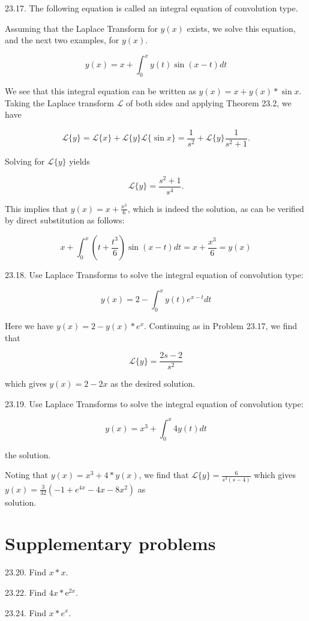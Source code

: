 \documentclass[10pt]{article}
\begin{document}
23.17. The following equation is called an integral equation of convolution type.

Assuming that the Laplace Transform for $y(x)$ exists, we solve this equation, and the next two examples, for $y(x)$.

$$
y(x)=x+\int_{0}^{x} y(t) \sin (x-t) d t
$$

We see that this integral equation can be written as $y(x)=x+y(x) * \sin x$. Taking the Laplace transform $\mathscr{L}$ of both sides and applying Theorem 23.2, we have

$$
\mathscr{L}\{y\}=\mathscr{L}\{x\}+\mathscr{L}\{y\} \mathscr{L}\{\sin x\}=\frac{1}{s^{2}}+\mathscr{L}\{y\} \frac{1}{s^{2}+1} .
$$

Solving for $\mathscr{L}\{y\}$ yields

$$
\mathscr{L}\{y\}=\frac{s^{2}+1}{s^{4}} .
$$

This implies that $y(x)=x+\frac{x^{3}}{6}$, which is indeed the solution, as can be verified by direct substitution as follows:

$$
x+\int_{0}^{x}\left(t+\frac{t^{3}}{6}\right) \sin (x-t) d t=x+\frac{x^{3}}{6}=y(x)
$$

23.18. Use Laplace Transforms to solve the integral equation of convolution type:

$$
y(x)=2-\int_{0}^{x} y(t) e^{x-t} d t
$$

Here we have $y(x)=2-y(x) * e^{x}$. Continuing as in Problem 23.17, we find that

$$
\mathscr{L}\{y\}=\frac{2 s-2}{s^{2}}
$$

which gives $y(x)=2-2 x$ as the desired solution.

23.19. Use Laplace Transforms to solve the integral equation of convolution type:

$$
y(x)=x^{3}+\int_{0}^{x} 4 y(t) d t
$$

the solution.

Noting that $y(x)=x^{3}+4 * y(x)$, we find that $\mathscr{L}\{y\}=\frac{6}{s^{3}(s-4)}$ which gives $y(x)=\frac{3}{32}\left(-1+e^{4 x}-4 x-8 x^{2}\right)$ as\\
solution.

\section*{Supplementary problems}
23.20. Find $x * x$.

23.22. Find $4 x * \mathrm{e}^{2 x}$.

23.24. Find $x * e^{x}$.
\end{document}
